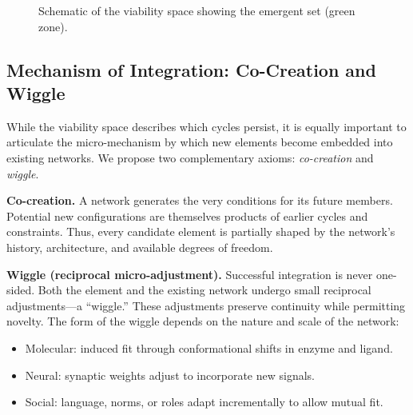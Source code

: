\documentclass[12pt,a4paper]{article}
\begin{document}
\begin{figure}[h]
\centering
{}
\caption{Schematic of the viability space showing the emergent set (green zone).}
\label{fig:viability}
\end{figure}

\subsection{Mechanism of Integration: Co-Creation and Wiggle}
While the viability space describes which cycles persist, it is equally important to articulate the micro-mechanism by which new elements become embedded into existing networks. We propose two complementary axioms: \emph{co-creation} and \emph{wiggle}.

\textbf{Co-creation.} A network generates the very conditions for its future members. Potential new configurations are themselves products of earlier cycles and constraints. Thus, every candidate element is partially shaped by the network’s history, architecture, and available degrees of freedom.

\textbf{Wiggle (reciprocal micro-adjustment).} Successful integration is never one-sided. Both the element and the existing network undergo small reciprocal adjustments—a ``wiggle.'' These adjustments preserve continuity while permitting novelty. The form of the wiggle depends on the nature and scale of the network:
\begin{itemize}
    \item Molecular: induced fit through conformational shifts in enzyme and ligand.
    \item Neural: synaptic weights adjust to incorporate new signals.
    \item Social: language, norms, or roles adapt incrementally to allow mutual fit.
\end{itemize}
\end{document}
